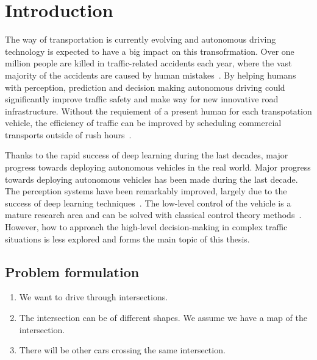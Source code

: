 \chapter{Introduction}\label{chapter:intro}
The way of transportation is currently evolving and autonomous driving technology is expected to have a big impact on this transofrmation. Over one million people are killed in traffic-related accidents each year, where the vast majority of the accidents are caused by human mistakes~\cite{WHO2018, NHTSA2018}. By helping humans with perception, prediction and decision making autonomous driving could significantly improve traffic safety and make way for new innovative road infrastructure. Without the requiement of a present human for each transpotation vehicle, the efficiency of traffic can be improved by scheduling commercial transports outside of rush hours~\cite{FAGNANT2015167}.



Thanks to the rapid success of deep learning during the last decades, major progress towards deploying autonomous vehicles in the real world.
Major progress towards deploying autonomous vehicles has been made during the last decade. The perception systems have been remarkably improved, largely due to the success of deep learning techniques~\cite{Janai2020}. The low-level control of the vehicle is a mature research area and can be solved with classical control theory methods~\cite{Paden2016}. However, how to approach the high-level decision-making in complex traffic situations is less explored and forms the main topic of this thesis.

\section{Problem formulation}

\begin{enumerate}
	\item We want to drive through intersections. 
	\item The intersection can be of different shapes. We assume we have a map of the intersection. 
	\item There will be other cars crossing the same intersection. 
	
\end{enumerate}

